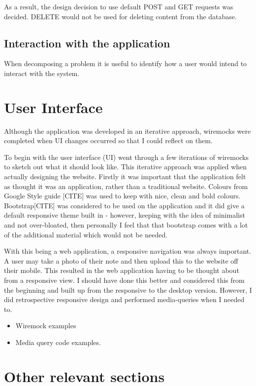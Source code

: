As a result, the design decision to use default POST and GET requests was decided. DELETE would not be used for deleting content from the database.

\subsection{Interaction with the application}
When decomposing a problem it is useful to identify how a user would intend to interact with the system.





\section{User Interface}
Although the application was developed in an iterative approach, wiremocks were completed when UI changes occurred so that I could reflect on them.

To begin with the user interface (UI) went through a few iterations of wiremocks to sketch out what it should look like.  This iterative approach was applied when actually designing the website. Firstly it was important that the application felt as thought it was an application, rather than a traditional website. Colours from Google Style guide [CITE] was used to keep with nice, clean and bold colours. Bootstrap[CITE] was considered to be used on the application and it did give a default responsive theme built in - however, keeping with the idea of minimalist and not over-bloated, then personally I feel that that bootstrap comes with a lot of the additional material which would not be needed.

With this being a web application, a responsive navigation was always important. A user may take a photo of their note and then upload this to the website off their mobile. This resulted in the web application having to be thought about from a responsive view. I should have done this better and considered this from the beginning and built up from the responsive to the desktop version. However, I did retrospective responsive design and performed media-queries when I needed to.
\begin{itemize}
  \item Wiremock examples
  \item Media query code examples.
\end{itemize}
\section{Other relevant sections}

